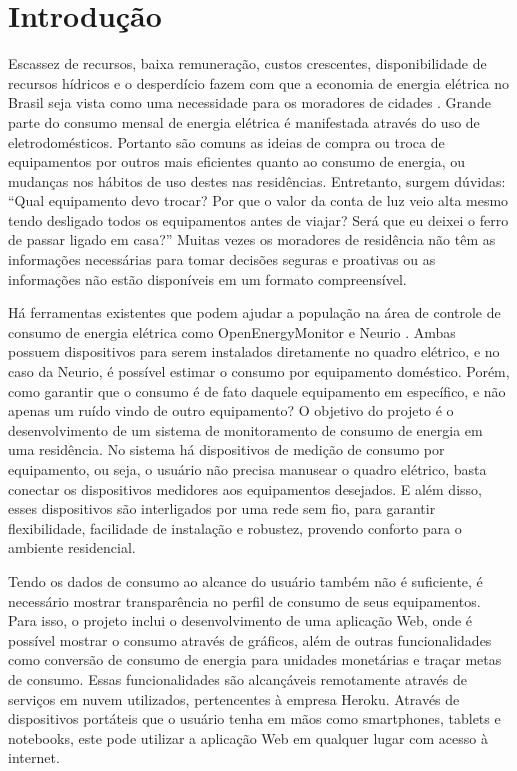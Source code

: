 \chapter{Introdução}
\label{Cap:Introducao}

Escassez de recursos, baixa remuneração, custos crescentes, disponibilidade de recursos hídricos e o desperdício fazem com que a economia de energia elétrica no Brasil seja vista como uma necessidade para os moradores de cidades \cite{eflul}. Grande parte do consumo mensal de energia elétrica é manifestada através do uso de eletrodomésticos. Portanto são comuns as ideias de compra ou troca de equipamentos por outros mais eficientes quanto ao consumo de energia, ou mudanças nos hábitos de uso destes nas residências. Entretanto, surgem dúvidas: ``Qual equipamento devo trocar? Por que o valor da conta de luz veio alta mesmo tendo desligado todos os equipamentos antes de viajar? Será que eu deixei o ferro de passar ligado em casa?'' Muitas vezes os moradores de residência não têm as informações necessárias para tomar decisões seguras e proativas ou as informações não estão disponíveis em um formato compreensível. 

Há ferramentas existentes que podem ajudar a população na área de controle de consumo de energia elétrica como OpenEnergyMonitor \cite{open_energy_monitor} e Neurio \cite{neurio_site}. Ambas possuem dispositivos para serem instalados diretamente no quadro elétrico, e no caso da Neurio, é possível estimar o consumo por equipamento doméstico. Porém, como garantir que o consumo é de fato daquele equipamento em específico, e não apenas um ruído vindo de outro equipamento? O objetivo do projeto é o desenvolvimento de um sistema de monitoramento de consumo de energia em uma residência. No sistema há dispositivos de medição de consumo por equipamento, ou seja, o usuário não precisa manusear o quadro elétrico, basta conectar os dispositivos medidores aos equipamentos desejados. E além disso, esses dispositivos são interligados por uma rede sem fio, para garantir flexibilidade, facilidade de instalação e robustez, provendo conforto para o ambiente residencial.

Tendo os dados de consumo ao alcance do usuário também não é suficiente, é necessário mostrar transparência no perfil de consumo de seus equipamentos. Para isso, o projeto inclui o desenvolvimento de uma aplicação Web, onde é possível mostrar o consumo através de gráficos, além de outras funcionalidades como conversão de consumo de energia para unidades monetárias e traçar metas de consumo. Essas funcionalidades são alcançáveis remotamente através de serviços em nuvem utilizados, pertencentes à empresa Heroku. Através de dispositivos portáteis que o usuário tenha em mãos como smartphones, tablets e notebooks, este pode utilizar a aplicação Web em qualquer lugar com acesso à internet. 

